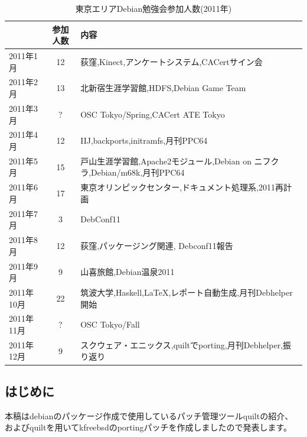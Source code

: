 \documentclass[mingoth,a4paper]{jsarticle}
\begin{document}
\begin{table}[t]
\begin{minipage}{0.5\hsize}
\end{minipage}
\begin{minipage}{0.5\hsize}
 \caption{東京エリアDebian勉強会参加人数(2011年)}\label{tab:count2011}
 \begin{center}
  \begin{tabular}{|l|c|p{10em}|}
 \hline
 & 参加人数 & 内容\\
 \hline
   2011年1月 & 12 & 荻窪,Kinect,アンケートシステム,CACertサイン会 \\
   2011年2月 & 13 & 北新宿生涯学習館,HDFS,Debian Game Team \\
   2011年3月 & ? & OSC Tokyo/Spring,CACert ATE Tokyo \\
   2011年4月 & 12 & IIJ,backports,initramfs,月刊PPC64 \\
   2011年5月 & 15 & 戸山生涯学習館,Apache2モジュール,Debian on ニフクラ,Debian/m68k,月刊PPC64 \\
   2011年6月 & 17 & 東京オリンピックセンター,ドキュメント処理系,2011再計画 \\
   2011年7月 & 3 & DebConf11 \\
   2011年8月 & 12 & 荻窪,パッケージング関連, Debconf11報告 \\
   2011年9月 & 9 & 山喜旅館,Debian温泉2011 \\
   2011年10月 & 22 & 筑波大学,Haskell,LaTeX,レポート自動生成,月刊Debhelper開始 \\
   2011年11月 & ? & OSC Tokyo/Fall \\
   2011年12月 & 9 & スクウェア・エニックス,quiltでporting,月刊Debhelper,振り返り \\
 \hline
  \end{tabular}
 \end{center}
\end{minipage}
\end{table}


 
\subsection{はじめに}
本稿はdebianのパッケージ作成で使用しているパッチ管理ツールquiltの紹介、
およびquiltを用いてkfreebsdのportingパッチを作成しましたので発表します。
\end{document}
